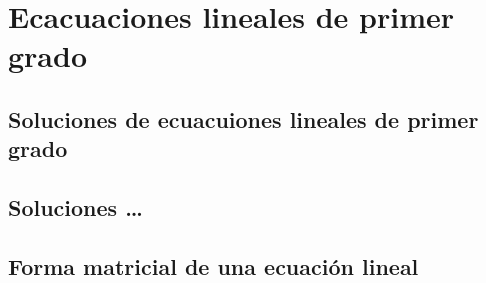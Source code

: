 \documentclass[10pt,]{krantz}
\theoremstyle{definition}
\theoremstyle{definition}
\theoremstyle{definition}
\theoremstyle{remark}
\begin{document}
\hypertarget{ecacuaciones-lineales-de-primer-grado}{%
\chapter{Ecacuaciones lineales de primer grado}\label{ecacuaciones-lineales-de-primer-grado}}

\hypertarget{soluciones-de-ecuacuiones-lineales-de-primer-grado}{%
\section{Soluciones de ecuacuiones lineales de primer grado}\label{soluciones-de-ecuacuiones-lineales-de-primer-grado}}

\hypertarget{soluciones}{%
\section{Soluciones \ldots{}}\label{soluciones}}

\hypertarget{forma-matricial-de-una-ecuaciuxf3n-lineal}{%
\section{Forma matricial de una ecuación lineal}\label{forma-matricial-de-una-ecuaciuxf3n-lineal}}



\printindex
\end{document}
